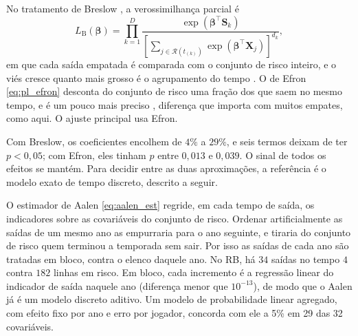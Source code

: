 No tratamento de Breslow \citep{breslow1974}, a verossimilhança parcial é
\begin{equation}
    L_{\mathrm{B}}(\boldsymbol{\beta})
    = \prod_{k=1}^{D}
      \frac{\exp\!\left(\boldsymbol{\beta}^{\top}\mathbf{S}_k\right)}
           {\left[\sum_{j \in \mathcal{R}(t_{(k)})} \exp\!\left(\boldsymbol{\beta}^{\top}\mathbf{X}_j\right)\right]^{d_k}},
    \label{eq:pl_breslow}
\end{equation}
em que cada saída empatada é comparada com o conjunto de risco inteiro, e o viés cresce quanto mais grosso é o agrupamento do tempo \citep{prentice1978}. O de Efron \eqref{eq:pl_efron} desconta do conjunto de risco uma fração dos que saem no mesmo tempo, e é um pouco mais preciso \citep{efron1977}, diferença que importa com muitos empates, como aqui. O ajuste principal usa Efron.

Com Breslow, os coeficientes encolhem de $4\%$ a $29\%$, e seis termos deixam de ter $p < 0{,}05$; com Efron, eles tinham $p$ entre $0{,}013$ e $0{,}039$. O sinal de todos os efeitos se mantém. Para decidir entre as duas aproximações, a referência é o modelo exato de tempo discreto, descrito a seguir.

O estimador de Aalen \eqref{eq:aalen_est} regride, em cada tempo de saída, os indicadores sobre as covariáveis do conjunto de risco. Ordenar artificialmente as saídas de um mesmo ano as empurraria para o ano seguinte, e tiraria do conjunto de risco quem terminou a temporada sem sair. Por isso as saídas de cada ano são tratadas em bloco, contra o elenco daquele ano. No RB, há $34$ saídas no tempo $4$ contra $182$ linhas em risco. Em bloco, cada incremento é a regressão linear do indicador de saída naquele ano (diferença menor que $10^{-13}$), de modo que o Aalen já é um modelo discreto aditivo. Um modelo de probabilidade linear agregado, com efeito fixo por ano e erro por jogador, concorda com ele a 5\% em 29 das 32 covariáveis.

